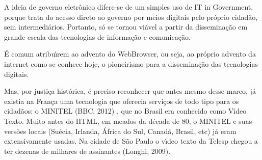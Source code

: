 \documentclass[
12pt,		%
openright,	%
twoside,  %
a4paper,			%
chapter=TITLE,		%
english,			%
french,				%
spanish,			%
brazil				%
]{USPSC-classe/USPSC}
\begin{document}
A ideia de governo eletr\^onico difere-se de um simples uso de \textquotedbl IT in Government\textquotedbl , porque trata do acesso direto ao governo por meios digitais pelo pr\'oprio cidad\~ao, sem intermedi\'arios. Portanto, s\'o se tornou vi\'avel a partir da dissemina\c{c}\~ao em grande escala das tecnologias de informa\c{c}\~ao e comunica\c{c}\~ao.

















\'E comum atribu\'{\i}rem ao advento do WebBrowser, ou seja, ao pr\'oprio advento da internet como se conhece hoje, o pioneirismo para a dissemina\c{c}\~ao das tecnologias digitais.

















Mas, por justi\c{c}a hist\'orica, \'e preciso reconhecer que antes mesmo desse marco, j\'a existia na Fran\c{c}a uma tecnologia que oferecia servi\c{c}os de todo tipo para os cidad\~aos: o MINITEL  (BBC, 2012) , que no Brasil era conhecido como V\'{\i}deo Texto. Muito antes do HTML, em meados da d\'ecada de 80, o MINITEL e suas vers\~oes locais (Su\'ecia, Irlanda, \'Africa do Sul, Canad\'a, Brasil, etc) j\'a eram extensivamente usadas. Na cidade de S\~ao Paulo o v\'{\i}deo texto da Telesp chegou a ter dezenas de milhares de assinantes  (Longhi, 2009).
\end{document}
